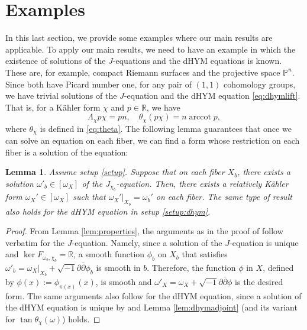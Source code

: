 \documentclass{amsart}
\numberwithin{equation}{section}
\theoremstyle{plain}
\newtheorem{lemma}[equation]{Lemma}
\theoremstyle{definition}
\theoremstyle{remark}
\begin{document}
\section{Examples}\label{sec:examples}
In this last section, we provide some examples where our main results are applicable. To apply our main results, we need to have an example in which the existence of solutions of the $J$-equations and the dHYM equations is known. These are, for example, compact Riemann surfaces and the projective space $\mathbb{P}^n$. Since both have Picard number one, for any pair of $(1,1)$ cohomology groups, we have trivial solutions of the $J$-equation and the dHYM equation \eqref{eq:dhymlift}. That is, for a Kähler form $\chi$ and $p\in\mathbb{R}$, we have
\begin{equation*}
    \Lambda_\chi p\chi=pn, \quad \theta_\chi(p\chi)=n\operatorname{arccot}p,
\end{equation*}
where $\theta_\chi$ is defined in \eqref{eq:theta}.
The following lemma guarantees that once we can solve an equation on each fiber, we can find a form whose restriction on each fiber is a solution of the equation:

\begin{lemma}
    Assume setup \ref{setup}. Suppose that on each fiber $X_b$, there exists a solution $\omega'_b\in[\omega_X]$ of the $J_{\chi_b}$-equation. Then, there exists a relatively Kähler form $\omega_X'\in[\omega_X]$ such that $\omega_X'|_{X_b}=\omega_b'$ on each fiber. The same type of result also holds for the dHYM equation in setup \ref{setup:dhym}.
\end{lemma}

\begin{proof}
    From Lemma \ref{lem:properties}, the arguments as in the proof of \cite[Lemma 2.1]{Fine2} follow verbatim for the $J$-equation. Namely, since a solution of the $J$-equation is unique and $\operatorname{ker}F_{\omega_b,\chi_b}=\mathbb{R}$, a smooth function $\phi_b$ on $X_b$ that satisfies $\omega'_b=\omega_X|_{X_b}+\sqrt{-1}\partial\bar{\partial}\phi_b$ is smooth in $b$. Therefore, the function $\phi$ in $X$, defined by $\phi(x):=\phi_{\pi(x)}(x)$, is smooth and $\omega'_X=\omega_X+\sqrt{-1}\partial\bar{\partial}\phi$ is the desired form. The same arguments also follow for the dHYM equation, since a solution of the dHYM equation is unique by \cite[Theorem 1.1]{JY} and Lemma \ref{lem:dhymadjoint} (and its variant for $\tan\theta_\chi(\omega)$) holds.
\end{proof}
\end{document}
